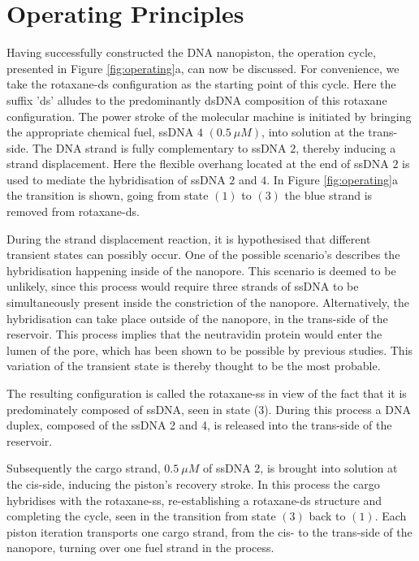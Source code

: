 \section{Operating Principles}

Having successfully constructed the DNA nanopiston, the operation cycle, presented in
Figure \ref{fig:operating}a, can now be discussed. For convenience, we take the
rotaxane-ds configuration as the starting
point of this cycle. Here the suffix ’ds’ alludes to the predominantly dsDNA composition
of this rotaxane configuration. The power stroke of the molecular machine is initiated by
bringing the appropriate chemical fuel, ssDNA $4$ $(0.5\ \mu M)$, into solution at the
trans-side.
The DNA strand is fully complementary to ssDNA $2$, thereby inducing a strand
displacement. Here the flexible overhang located at the end of ssDNA $2$ is used to
mediate the hybridisation of ssDNA $2$ and $4$. In Figure \ref{fig:operating}a the
transition is shown, going from state $(1)$ to $(3)$ the blue strand is removed from
rotaxane-ds.

During the strand displacement reaction, it is hypothesised that different transient
states can possibly occur. One of the possible scenario's describes the hybridisation
happening inside of the nanopore. This scenario is deemed to be unlikely, since this
process would require three strands of ssDNA to be simultaneously present inside the
constriction of the nanopore. Alternatively, the hybridisation can take place outside of
the nanopore, in the trans-side of the reservoir. This process implies that the
neutravidin protein would enter the lumen of the pore, which has been shown to be
possible by previous studies. \cite{Lu2018} This variation of the transient state is
thereby thought to be the most probable.

The resulting configuration is called the rotaxane-ss in view of the fact that it is
predominately composed of ssDNA, seen in state (3). During this process a DNA duplex,
composed of
the ssDNA 2 and 4, is released into the trans-side of the reservoir.

Subsequently the cargo strand, $0.5\ \mu M$ of ssDNA $2$,  is brought into solution at
the cis-side, inducing the piston's recovery stroke. In this process the cargo hybridises
with the rotaxane-ss, re-establishing a rotaxane-ds structure and completing the cycle,
seen in the transition from state $(3)$ back to $(1)$.
Each piston iteration transports one cargo strand, from the cis- to the trans-side of
the nanopore, turning over one fuel strand in the process.

